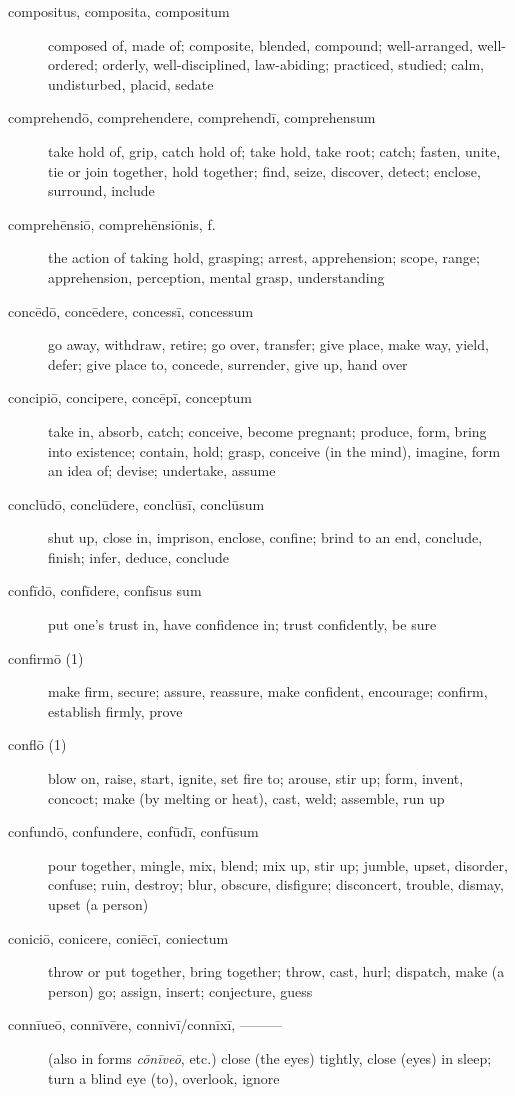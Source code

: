 \begin{description}
    \item[compositus, composita, compositum] composed of, made of; composite, blended, compound; well-arranged, well-ordered; orderly, well-disciplined, law-abiding; practiced, studied; calm, undisturbed, placid, sedate
    \item[comprehendō, comprehendere, comprehendī, comprehensum] take hold of, grip, catch hold of; take hold, take root; catch; fasten, unite, tie or join together, hold together; find, seize, discover, detect; enclose, surround, include
    \item[comprehēnsiō, comprehēnsiōnis, f.] the action of taking hold, grasping; arrest, apprehension; scope, range; apprehension, perception, mental grasp, understanding
    \item[concēdō, concēdere, concessī, concessum] \marginnote{*}go away, withdraw, retire; go over, transfer; give place, make way, yield, defer; give place to, concede, surrender, give up, hand over
    \item[concipiō, concipere, concēpī, conceptum] take in, absorb, catch; conceive, become pregnant; produce, form, bring into existence; contain, hold; grasp, conceive (in the mind), imagine, form an idea of; devise; undertake, assume
    \item[conclūdō, conclūdere, conclūsī, conclūsum] shut up, close in, imprison, enclose, confine; brind to an end, conclude, finish; infer, deduce, conclude
    \item[confīdō, confīdere, confīsus sum] put one's trust in, have confidence in; trust confidently, be sure
    \item[confirmō (1)] make firm, secure; assure, reassure, make confident, encourage; confirm, establish firmly, prove
    \item[conflō (1)] blow on, raise, start, ignite, set fire to; arouse, stir up; form, invent, concoct; make (by melting or heat), cast, weld; assemble, run up
    \item[confundō, confundere, confūdī, confūsum] pour together, mingle, mix, blend; mix up, stir up; jumble, upset, disorder, confuse; ruin, destroy; blur, obscure, disfigure; disconcert, trouble, dismay, upset (a person)
    \item[coniciō, conicere, coniēcī, coniectum] throw or put together, bring together; throw, cast, hurl; dispatch, make (a person) go; assign, insert; conjecture, guess
    \item[connīueō, connīvēre, connivī/connīxī, ———] (also in forms \textit{cōnīveō}, etc.) close (the eyes) tightly, close (eyes) in sleep; turn a blind eye (to), overlook, ignore

\end{description}
